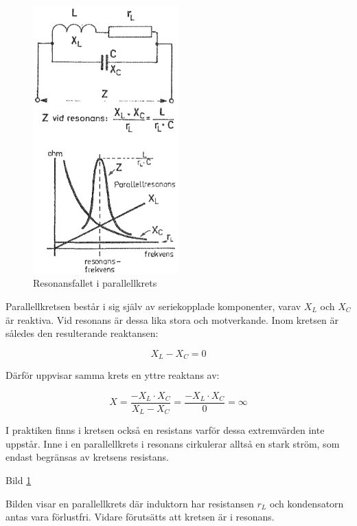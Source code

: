 \begin{figure}[h]
\begin{center}
  \includegraphics[width=0.5\textwidth]{images/cropped_pdfs/bild_2_3-18.pdf}
  \caption{Resonansfallet i parallellkrets}
  \label{fig:BildII3-18}
\end{center}
\end{figure}

Parallellkretsen består i sig själv av seriekopplade komponenter, varav
\(X_L\) och \(X_C\) är reaktiva. Vid resonans är dessa lika stora och
motverkande. Inom kretsen är således den resulterande reaktansen:

\[X_L - X_C = 0\]

Därför uppvisar samma krets en yttre reaktans av:

\[
  X = \frac{-X_L \cdot X_C}{X_L - X_C}
  = \frac{-X_L \cdot X_C}{0}
  = \infty
\]

I praktiken finns i kretsen också en resistans varför dessa extremvärden inte
uppstår. Inne i en parallellkrets i resonans cirkulerar alltså en stark ström,
som endast begränsas av kretsens resistans.

Bild \ref{fig:BildII3-18}

Bilden visar en parallellkrets där induktorn har resistansen \(r_L\) och
kondensatorn antas vara förlustfri. Vidare förutsätts att kretsen är i resonans.

